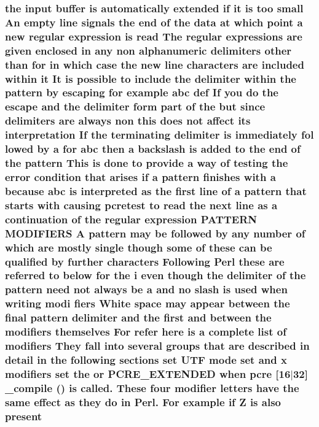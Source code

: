 \subsubsection[{\texorpdfstring{present}{present}}]{\setlength{\rightskip}{0pt plus 5cm}the {\bf input} {\bf buffer} {\bf is} automatically extended {\bf if} {\bf it} {\bf is} too small An {\bf empty} {\bf line} signals the {\bf end} {\bf of} the {\bf data} at {\bf which} {\bf point} {\bf a} new regular {\bf expression} {\bf is} {\bf read} The regular {\bf expressions} {\bf are} {\bf given} enclosed {\bf in} {\bf any} non {\bf alphanumeric} delimiters other {\bf than} for {\bf in} {\bf which} {\bf case} the new {\bf line} {\bf characters} {\bf are} {\bf included} within {\bf it} It {\bf is} {\bf possible} {\bf to} {\bf include} the delimiter within the {\bf pattern} by escaping for {\bf example} {\bf abc} def If you {\bf do} the escape and the delimiter form part {\bf of} the but since delimiters {\bf are} always non {\bf this} does {\bf not} affect its interpretation If the terminating delimiter {\bf is} immediately fol lowed by {\bf a} for {\bf abc} then {\bf a} {\bf backslash} {\bf is} added {\bf to} the {\bf end} {\bf of} the {\bf pattern} This {\bf is} {\bf done} {\bf to} provide {\bf a} {\bf way} {\bf of} testing the {\bf error} condition that {\bf arises} {\bf if} {\bf a} {\bf pattern} finishes {\bf with} {\bf a} because {\bf abc} {\bf is} interpreted {\bf as} the {\bf first} {\bf line} {\bf of} {\bf a} {\bf pattern} that starts {\bf with} causing {\bf pcretest} {\bf to} {\bf read} the next {\bf line} {\bf as} {\bf a} continuation {\bf of} the regular {\bf expression} P\+A\+T\+T\+E\+RN M\+O\+D\+I\+F\+I\+E\+RS {\bf A} {\bf pattern} may {\bf be} followed by {\bf any} {\bf number} {\bf of} {\bf which} {\bf are} mostly single {\bf though} some {\bf of} these {\bf can} {\bf be} qualified by further {\bf characters} Following {\bf Perl} these {\bf are} referred {\bf to} {\bf below} for the {\bf i} even {\bf though} the delimiter {\bf of} the {\bf pattern} need {\bf not} always {\bf be} {\bf a} and no {\bf slash} {\bf is} {\bf used} when writing modi fiers White {\bf space} may appear between the final {\bf pattern} delimiter and the {\bf first} and between the {\bf modifiers} {\bf themselves} For refer {\bf here} {\bf is} {\bf a} complete {\bf list} {\bf of} {\bf modifiers} They fall into several groups that {\bf are} described {\bf in} detail {\bf in} the following sections {\bf set} U\+TF {\bf mode} {\bf set} and {\bf x} {\bf modifiers} {\bf set} the {\bf or} {\bf P\+C\+R\+E\+\_\+\+E\+X\+T\+E\+N\+D\+ED} when {\bf pcre} \mbox{[}16$\vert$32\mbox{]} {\bf \+\_\+compile} () {\bf is} called. These four {\bf modifier} letters have the same effect {\bf as} they {\bf do} {\bf in} Perl. For {\bf example} {\bf if} Z {\bf is} also present}\hypertarget{pcretest_8txt_ae0e1f0a151abbf98aa1e731833fa9411}{}\label{pcretest_8txt_ae0e1f0a151abbf98aa1e731833fa9411}
